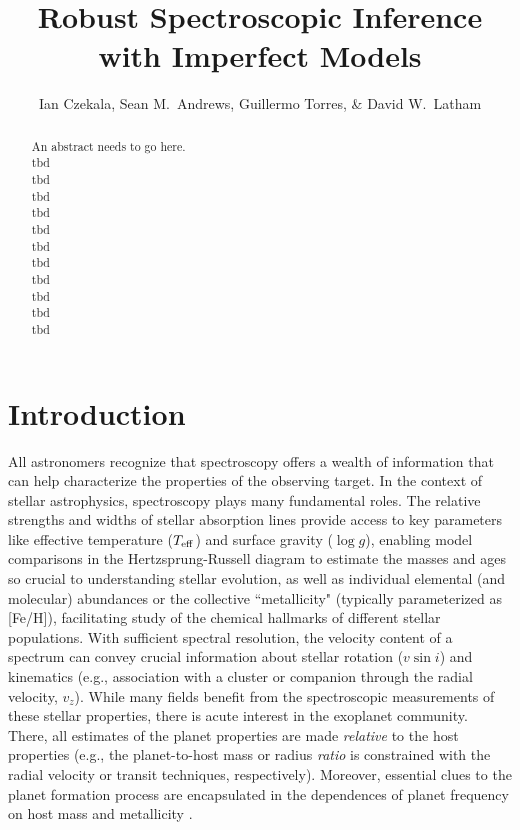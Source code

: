 \documentclass[iop,floatfix]{emulateapj}
\begin{document}
\graphicspath{{figs/}}



\title{Robust Spectroscopic Inference with Imperfect Models}
\author{Ian Czekala, Sean M.~Andrews, Guillermo Torres, \& David W.~Latham}

\begin{abstract}
An abstract needs to go here. \\
tbd \\
tbd \\
tbd \\
tbd \\
tbd \\
tbd \\
tbd \\
tbd \\
tbd \\
tbd \\
tbd
\end{abstract}


\section{Introduction} \label{sec:intro}

All astronomers recognize that spectroscopy offers a wealth of information that can help
characterize the properties of the observing target.  In the context of stellar astrophysics, 
spectroscopy plays many fundamental roles.  The relative strengths and widths of stellar absorption 
lines provide access to key parameters like effective temperature ($T_{\rm eff}$) and surface 
gravity ($\log g$), enabling model comparisons in the Hertzsprung-Russell diagram to estimate the 
masses and ages so crucial to understanding stellar evolution, as well as individual elemental (and 
molecular) abundances or the collective ``metallicity" (typically parameterized as [Fe/H]), 
facilitating study of the chemical hallmarks of different stellar populations.  With sufficient 
spectral resolution, the velocity content of a spectrum can convey crucial information about 
stellar rotation ($v \sin i$) and kinematics (e.g., association with a cluster or companion through 
the radial velocity, $v_z$).  While many fields benefit from the spectroscopic measurements of 
these stellar properties, there is acute interest in the exoplanet community.  There, all estimates 
of the planet properties are made {\it relative} to the host properties (e.g., the planet-to-host 
mass or radius {\it ratio} is constrained with the radial velocity or transit techniques, 
respectively).  Moreover, essential clues to the planet formation process are encapsulated in the 
dependences of planet frequency on host mass \citep[e.g.,][]{johnson07,howard10} and metallicity 
\citep[e.g.,][]{fischer05,buchhave14}.   
\end{document}
